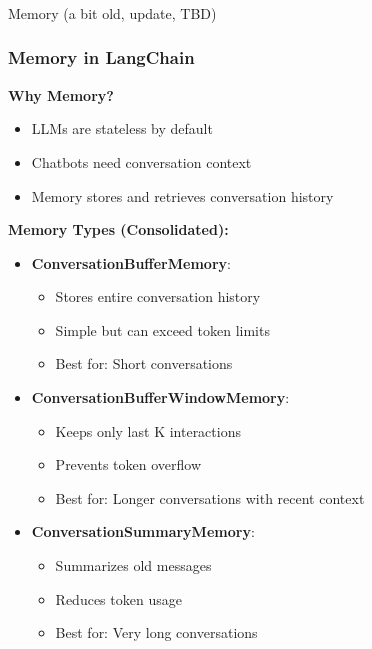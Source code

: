 \begin{frame}[fragile]\frametitle{}
\begin{center}
{\Large Memory (a bit old, update, TBD)}
\end{center}
\end{frame}

\begin{frame}\frametitle{Memory in LangChain}

\textbf{Why Memory?}
\begin{itemize}
\item LLMs are stateless by default
\item Chatbots need conversation context
\item Memory stores and retrieves conversation history
\end{itemize}

\textbf{Memory Types (Consolidated):}
\begin{itemize}
\item \textbf{ConversationBufferMemory}:
    \begin{itemize}
    \item Stores entire conversation history
    \item Simple but can exceed token limits
    \item Best for: Short conversations
    \end{itemize}

\item \textbf{ConversationBufferWindowMemory}:
    \begin{itemize}
    \item Keeps only last K interactions
    \item Prevents token overflow
    \item Best for: Longer conversations with recent context
    \end{itemize}

\item \textbf{ConversationSummaryMemory}:
    \begin{itemize}
    \item Summarizes old messages
    \item Reduces token usage
    \item Best for: Very long conversations
    \end{itemize}
\end{itemize}

\end{frame}

